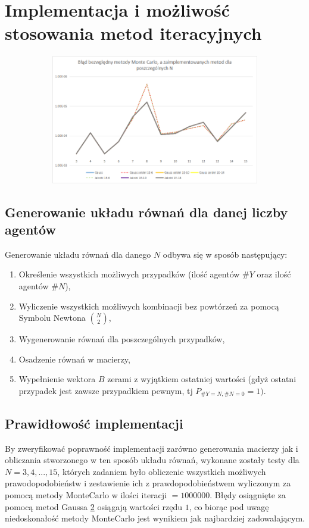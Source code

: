 \documentclass[10pt]{article}
\begin{document}
\section{Implementacja i możliwość stosowania metod iteracyjnych}
\begin{figure}[h]
	\caption{Wykres reprezentujący błąd bezwzględny metod Gaussa oraz metod iteracyjnych względem metody MonteCarlo\label{rys}}
	\centering
	\begin{subfigure}{0.5\textwidth}
		\includegraphics[width=\textwidth]{1.png}
		\caption{ \label{Rys1a}}
	\end{subfigure}
\end{figure}
\subsection{Generowanie układu równań dla danej liczby agentów}
Generowanie układu równań dla danego $N$ odbywa się w sposób następujący:
\begin{enumerate}
	\item Określenie wszystkich możliwych przypadków (ilość agentów $\#Y$ oraz ilość agentów $\#N$),
	\item Wyliczenie wszystkich możliwych kombinacji bez powtórzeń za pomocą Symbolu Newtona ${{N} \choose {2}}$,
	\item Wygenerowanie równań dla poszczególnych przypadków,
	\item Osadzenie równań w macierzy,
	\item Wypełnienie wektora $B$ zerami z wyjątkiem ostatniej wartości (gdyż ostatni przypadek jest zawsze przypadkiem pewnym, tj $P_{\#Y=N,\#N=0}=1)$.
\end{enumerate}
\subsection{Prawidłowość implementacji}
By zweryfikować poprawność implementacji zarówno generowania macierzy jak i obliczania stworzonego w ten sposób układu równań, wykonane zostały testy dla $N = 3,4,...,15$, których zadaniem było obliczenie wszystkich możliwych prawodopodobieństw i zestawienie ich z prawdopodobieństwem wyliczonym za pomocą metody MonteCarlo w ilości iteracji $=1000000$.
Błędy osiągnięte za pomocą metod Gaussa \ref{Rys1a} osiągają wartości rzędu $1$, co biorąc pod uwagę niedoskonałość metody MonteCarlo jest wynikiem jak najbardziej zadowalającym.
\end{document}
